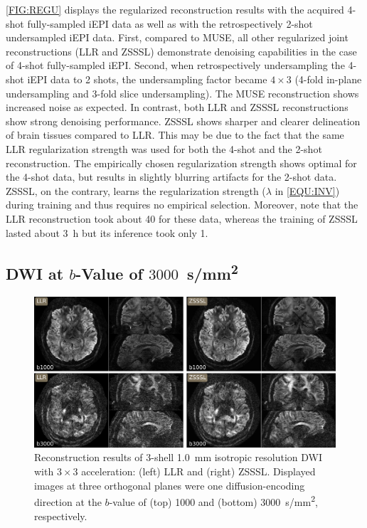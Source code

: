 \documentclass[journal,twoside,web]{ieeecolor}
\begin{document}
	\cref{FIG:REGU} displays the regularized reconstruction results
	with the acquired 4-shot fully-sampled iEPI data as well as
	with the retrospectively 2-shot undersampled iEPI data.
	First, compared to MUSE, all other regularized joint reconstructions (LLR and ZSSSL)
	demonstrate denoising capabilities in the case of 4-shot fully-sampled iEPI.
	Second, when retrospectively undersampling the 4-shot iEPI data to 2 shots,
	the undersampling factor became $4 \times 3$
	(4-fold in-plane undersampling and 3-fold slice undersampling).
	The MUSE reconstruction shows increased noise as expected.
	In contrast, both LLR and ZSSSL reconstructions show strong denoising performance.
	ZSSSL shows sharper and clearer delineation of brain tissues compared to LLR.
	This may be due to the fact that the same LLR regularization strength was used
	for both the 4-shot and the 2-shot reconstruction.
	The empirically chosen regularization strength shows optimal for the 4-shot data,
	but results in slightly blurring artifacts for the 2-shot data.
	ZSSSL, on the contrary, learns the regularization strength 
	($\lambda$ in \cref{EQU:INV}) during training
	and thus requires no empirical selection.
	Moreover, note that the LLR reconstruction took about \SI{40}{\min} for these data,
	whereas the training of ZSSSL lasted about \SI{3}{\hour}
	but its inference took only \SI{1}{\min}.
	
	
	\subsection{DWI at $b$-Value of $3000$~\si{s/mm^2}}
	
	\begin{figure}
		\centering
		\includegraphics[width=\textwidth]{../figures/fig3.png}
		\caption{Reconstruction results of 3-shell \SI{1.0}{mm} isotropic resolution 
		DWI with $3 \times 3$ acceleration: (left) LLR and (right) ZSSSL.
		Displayed images at three orthogonal planes were 
		one diffusion-encoding direction at the $b$-value of 
		(top) 1000 and (bottom) \SI{3000}{s/mm^2}, respectively.}
		\label{FIG:B3000}
	\end{figure}
	
\end{document}
